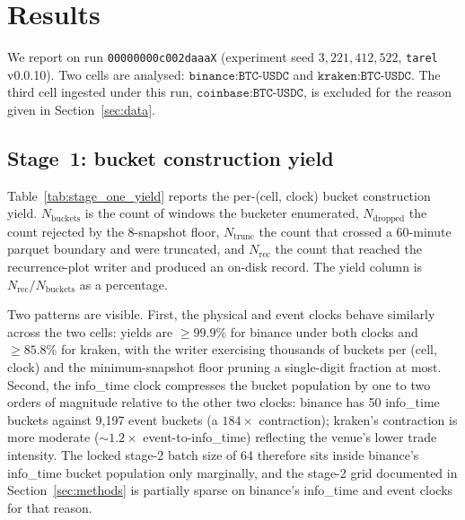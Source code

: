 \section{Results}
\label{sec:results}

We report on run \texttt{00000000c002daaaX} (experiment seed
$3{,}221{,}412{,}522$, \texttt{tarel} v0.0.10). Two cells are
analysed: $\texttt{binance:BTC-USDC}$ and $\texttt{kraken:BTC-USDC}$.
The third cell ingested under this run, $\texttt{coinbase:BTC-USDC}$,
is excluded for the reason given in Section~\ref{sec:data}.

\subsection*{Stage~1: bucket construction yield}
Table~\ref{tab:stage_one_yield} reports the per-(cell, clock) bucket
construction yield. $N_{\text{buckets}}$ is the count of windows the
bucketer enumerated, $N_{\text{dropped}}$ the count rejected by the
8-snapshot floor, $N_{\text{trunc}}$ the count that crossed a
60-minute parquet boundary and were truncated, and
$N_{\text{rec}}$ the count that reached the recurrence-plot writer
and produced an on-disk record. The yield column is
$N_{\text{rec}} / N_{\text{buckets}}$ as a percentage.



Two patterns are visible. First, the physical and event clocks behave
similarly across the two cells: yields are $\geq 99.9\%$ for binance
under both clocks and $\geq 85.8\%$ for kraken, with the writer
exercising thousands of buckets per (cell, clock) and the
minimum-snapshot floor pruning a single-digit fraction at most.
Second, the info\_time clock compresses the bucket population by one
to two orders of magnitude relative to the other two clocks: binance
has 50 info\_time buckets against 9{,}197 event buckets (a $184\times$
contraction); kraken's contraction is more moderate ($\sim 1.2\times$
event-to-info\_time) reflecting the venue's lower trade intensity.
The locked stage-2 batch size of 64 therefore sits inside binance's
info\_time bucket population only marginally, and the stage-2 grid
documented in Section~\ref{sec:methods} is partially sparse on
binance's info\_time and event clocks for that reason.

